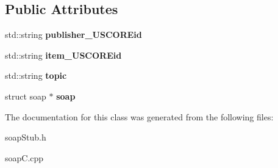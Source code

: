 \subsection*{Public Attributes}
\begin{DoxyCompactItemize}
\item 
\hypertarget{class__pass____retract__USCOREitem_a786f466c8537e8a53a3871c4bdf6c9e5}{
std::string {\bfseries publisher\_\-USCOREid}}
\label{class__pass____retract__USCOREitem_a786f466c8537e8a53a3871c4bdf6c9e5}

\item 
\hypertarget{class__pass____retract__USCOREitem_a7e4c07fc9169e7949ec368d37b365409}{
std::string {\bfseries item\_\-USCOREid}}
\label{class__pass____retract__USCOREitem_a7e4c07fc9169e7949ec368d37b365409}

\item 
\hypertarget{class__pass____retract__USCOREitem_a774a457d3c7c9d3b5bf84fc86f58a6f8}{
std::string {\bfseries topic}}
\label{class__pass____retract__USCOREitem_a774a457d3c7c9d3b5bf84fc86f58a6f8}

\item 
\hypertarget{class__pass____retract__USCOREitem_a5c7fdafb5b5696a34e67a37852a41a44}{
struct soap $\ast$ {\bfseries soap}}
\label{class__pass____retract__USCOREitem_a5c7fdafb5b5696a34e67a37852a41a44}

\end{DoxyCompactItemize}


The documentation for this class was generated from the following files:\begin{DoxyCompactItemize}
\item 
soapStub.h\item 
soapC.cpp\end{DoxyCompactItemize}
